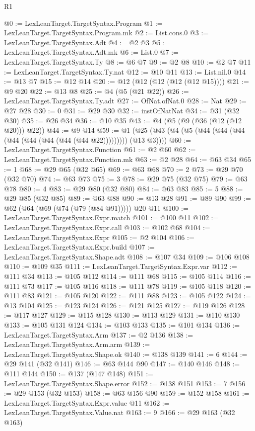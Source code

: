 \begin{lexlean}{R1}
\begin{coremodule}
{{{{{{{{{{{{{{{{{{{{{{{{{{{{{{{{{{{{{{{{{{{{{{{{{{{{{{{{{{{{{{{{{{{{{{{{{{{{{{{{{{{{{{{{{{@0 := LexLeanTarget.TargetSyntax.Program
@1 := LexLeanTarget.TargetSyntax.Program.mk
@2 := List.cons.{0}
@3 := LexLeanTarget.TargetSyntax.Adt
@4 := @2 @3
@5 := LexLeanTarget.TargetSyntax.Adt.mk
@6 := List.{0}
@7 := LexLeanTarget.TargetSyntax.Ty
@8 := @6 @7
@9 := @2 @8
@10 := @2 @7
@11 := LexLeanTarget.TargetSyntax.Ty.nat
@12 := @10 @11
@13 := List.nil.{0}
@14 := @13 @7
@15 := @12 @14
@20 := @12 (@12 (@12 (@12 (@12 @15))))
@21 := @9 @20
@22 := @13 @8
@25 := @4 (@5 (@21 @22))
@26 := LexLeanTarget.TargetSyntax.Ty.adt
@27 := OfNat.ofNat.{0}
@28 := Nat
@29 := @27 @28
@30 := 0
@31 := @29 @30
@32 := instOfNatNat
@34 := @31 (@32 @30)
@35 := @26 @34
@36 := @10 @35
@43 := @4 (@5 (@9 (@36 (@12 (@12 @20))) @22))
@44 := @9 @14
@59 := @1 (@25 (@43 (@4 (@5 (@44 (@44 (@44 (@44 (@44 (@44 (@44 (@44 @22))))))))) (@13 @3))))
@60 := LexLeanTarget.TargetSyntax.Function
@61 := @2 @60
@62 := LexLeanTarget.TargetSyntax.Function.mk
@63 := @2 @28
@64 := @63 @34
@65 := 1
@68 := @29 @65 (@32 @65)
@69 := @63 @68
@70 := 2
@73 := @29 @70 (@32 @70)
@74 := @63 @73
@75 := 3
@78 := @29 @75 (@32 @75)
@79 := @63 @78
@80 := 4
@83 := @29 @80 (@32 @80)
@84 := @63 @83
@85 := 5
@88 := @29 @85 (@32 @85)
@89 := @63 @88
@90 := @13 @28
@91 := @89 @90
@99 := @62 (@64 (@69 (@74 (@79 (@84 @91))))) @20 @11
@100 := LexLeanTarget.TargetSyntax.Expr.match
@101 := @100 @11
@102 := LexLeanTarget.TargetSyntax.Expr.call
@103 := @102 @68
@104 := LexLeanTarget.TargetSyntax.Expr
@105 := @2 @104
@106 := LexLeanTarget.TargetSyntax.Expr.build
@107 := LexLeanTarget.TargetSyntax.Shape.adt
@108 := @107 @34
@109 := @106 @108
@110 := @109 @35
@111 := LexLeanTarget.TargetSyntax.Expr.var
@112 := @111 @34
@113 := @105 @112
@114 := @111 @68
@115 := @105 @114
@116 := @111 @73
@117 := @105 @116
@118 := @111 @78
@119 := @105 @118
@120 := @111 @83
@121 := @105 @120
@122 := @111 @88
@123 := @105 @122
@124 := @13 @104
@125 := @123 @124
@126 := @121 @125
@127 := @119 @126
@128 := @117 @127
@129 := @115 @128
@130 := @113 @129
@131 := @110 @130
@133 := @105 @131 @124
@134 := @103 @133
@135 := @101 @134
@136 := LexLeanTarget.TargetSyntax.Arm
@137 := @2 @136
@138 := LexLeanTarget.TargetSyntax.Arm.arm
@139 := LexLeanTarget.TargetSyntax.Shape.ok
@140 := @138 @139
@141 := 6
@144 := @29 @141 (@32 @141)
@146 := @63 @144 @90
@147 := @140 @146
@148 := @111 @144
@150 := @137 (@147 @148)
@151 := LexLeanTarget.TargetSyntax.Shape.error
@152 := @138 @151
@153 := 7
@156 := @29 @153 (@32 @153)
@158 := @63 @156 @90
@159 := @152 @158
@161 := LexLeanTarget.TargetSyntax.Expr.value @11
@162 := LexLeanTarget.TargetSyntax.Value.nat
@163 := 9
@166 := @29 @163 (@32 @163)
}}}}}}}}}}}}}}}}}}}}}}}}}}}}}}}}}}}}}}}}}}}}}}}}}}}}}}}}}}}}}}}}}}}}}}}}}}}}}}}}}}}}}}}}}}
\end{coremodule}
\end{lexlean}
